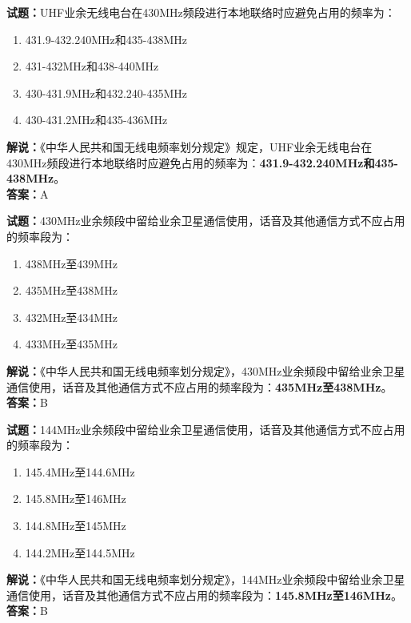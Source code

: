 \documentclass{ctexbook}
\begin{document}
\vspace{1em}

\textbf{试题：}UHF业余无线电台在430\unit{\MHz}频段进行本地联络时应避免占用的频率为：
\begin{enumerate}[leftmargin=3em]
  \item 431.9-432.240\unit{\MHz}和435-438\unit{\MHz}
  \item 431-432\unit{\MHz}和438-440\unit{\MHz}
  \item 430-431.9\unit{\MHz}和432.240-435\unit{\MHz}
  \item 430-431.2\unit{\MHz}和435-436\unit{\MHz}
\end{enumerate}
\noindent\textbf{解说：}《中华人民共和国无线电频率划分规定》规定，UHF业余无线电台在430\unit{\MHz}频段进行本地联络时应避免占用的频率为：\textbf{431.9-432.240\unit{\MHz}和435-438\unit{\MHz}}。\\\noindent\textbf{答案：}A

\vspace{1em}

\textbf{试题：}430\unit{\MHz}业余频段中留给业余卫星通信使用，话音及其他通信方式不应占用的频率段为：
\begin{enumerate}[leftmargin=3em]
  \item 438\unit{\MHz}至439\unit{\MHz}
  \item 435\unit{\MHz}至438\unit{\MHz}
  \item 432\unit{\MHz}至434\unit{\MHz}
  \item 433\unit{\MHz}至435\unit{\MHz}
\end{enumerate}
\noindent\textbf{解说：}《中华人民共和国无线电频率划分规定》，430\unit{\MHz}业余频段中留给业余卫星通信使用，话音及其他通信方式不应占用的频率段为：\textbf{435\unit{\MHz}至438\unit{\MHz}}。\\\noindent\textbf{答案：}B

\vspace{1em}

\textbf{试题：}144\unit{\MHz}业余频段中留给业余卫星通信使用，话音及其他通信方式不应占用的频率段为：
\begin{enumerate}[leftmargin=3em]
  \item 145.4\unit{\MHz}至144.6\unit{\MHz}
  \item 145.8\unit{\MHz}至146\unit{\MHz}
  \item 144.8\unit{\MHz}至145\unit{\MHz}
  \item 144.2\unit{\MHz}至144.5\unit{\MHz}
\end{enumerate}
\noindent\textbf{解说：}《中华人民共和国无线电频率划分规定》，144\unit{\MHz}业余频段中留给业余卫星通信使用，话音及其他通信方式不应占用的频率段为：\textbf{145.8\unit{\MHz}至146\unit{\MHz}}。\\\noindent\textbf{答案：}B
\end{document}

